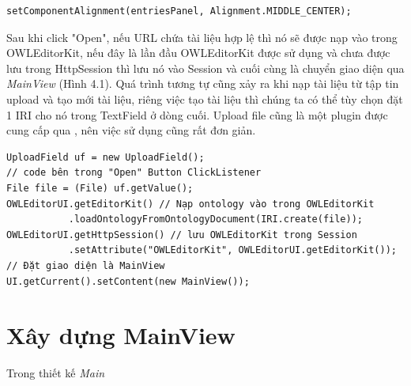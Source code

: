 \begin{verbatim}
setComponentAlignment(entriesPanel, Alignment.MIDDLE_CENTER);
\end{verbatim}
Sau khi click "Open", nếu URL chứa tài liệu hợp lệ thì nó sẽ được nạp vào trong OWLEditorKit, nếu đây là lần đầu OWLEditorKit được sử dụng và chưa được lưu trong HttpSession thì lưu nó vào Session và cuối cùng là chuyển giao diện qua \textit{MainView} (Hình 4.1). Quá trình tương tự cũng xảy ra khi nạp tài liệu từ tập tin upload và tạo mới tài liệu, riêng việc tạo tài liệu thì chúng ta có thể tùy chọn đặt 1 IRI cho nó trong TextField ở dòng cuối. Upload file cũng là một plugin được cung cấp qua \cite{vaadindirectory}, nên việc sử dụng cũng rất đơn giản.
\begin{verbatim}
UploadField uf = new UploadField();
// code bên trong "Open" Button ClickListener
File file = (File) uf.getValue();
OWLEditorUI.getEditorKit() // Nạp ontology vào trong OWLEditorKit
           .loadOntologyFromOntologyDocument(IRI.create(file));
OWLEditorUI.getHttpSession() // lưu OWLEditorKit trong Session
           .setAttribute("OWLEditorKit", OWLEditorUI.getEditorKit());
// Đặt giao diện là MainView 
UI.getCurrent().setContent(new MainView());                    
\end{verbatim}

\section{Xây dựng MainView}
Trong thiết kế \textit{Main}
